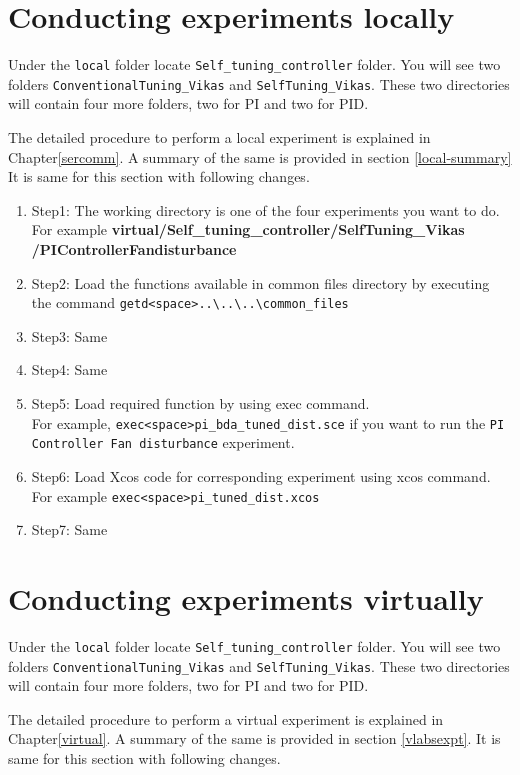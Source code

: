 \section{Conducting experiments locally}
Under the {\tt local} folder locate {\tt Self\_tuning\_controller} folder. You will see two folders {\tt ConventionalTuning\_Vikas} and {\tt SelfTuning\_Vikas}. These two directories will contain four more folders, two for PI and two for PID.

The detailed procedure to perform a local experiment is explained in Chapter\ref{sercomm}. A summary of the same is provided in section \ref{local-summary} It is same for this section with following changes.

\begin{enumerate}
\item Step1: The working directory is one of the four experiments you want to do. For example {\bf virtual/Self\_tuning\_controller/SelfTuning\_Vikas\\/PIControllerFandisturbance}
\item Step2:  Load the functions available in common files directory by executing the command {\tt getd<space>..\textbackslash ..\textbackslash ..\textbackslash common\_files\ }
\item Step3: Same
\item Step4: Same
\item Step5: Load required function by using exec command.\\For example, {\tt exec<space>pi\_bda\_tuned\_dist.sce} if you want to run the {\tt PI Controller Fan disturbance} experiment.  
\item Step6: Load Xcos code for corresponding experiment using xcos command.\\For example  {\tt exec<space>pi\_tuned\_dist.xcos}
\item Step7: Same
\end{enumerate}

\section{Conducting experiments virtually}
Under the {\tt local} folder locate {\tt Self\_tuning\_controller} folder. You will see two folders {\tt ConventionalTuning\_Vikas} and {\tt SelfTuning\_Vikas}. These two directories will contain four more folders, two for PI and two for PID.

The detailed procedure to perform a virtual experiment is explained in Chapter\ref{virtual}. A summary of the same is provided in section \ref{vlabsexpt}. It is same for this section with following changes.


